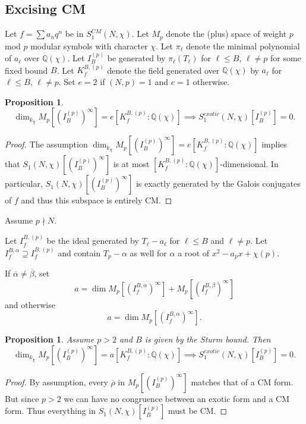 \documentclass[11pt]{amsart}
\theoremstyle{plain}
\newtheorem{prop}[thm]{Proposition}
\theoremstyle{definition}
\newcommand{\Q}{{\mathbb Q}}
\newcommand{\rhobar}{\overline{\rho}}
\renewcommand{\[}{\left[}
\renewcommand{\]}{\right]}
\begin{document}
\subsection{Excising CM}

Let $f=\sum a_n q^n$ be in $S_1^{CM}(N,\chi)$.  Let $M_p$ denote the (plus) space of weight $p$ mod $p$ modular symbols with character $\chi$.  Let $\pi_\ell$ denote the minimal polynomial of $a_\ell$ over $\Q(\chi)$.  Let $I^{(p)}_B$ be generated by $\pi_\ell(T_\ell)$ for $\ell \leq B$, $\ell \neq p$ for some fixed bound $B$.  Let $K_f^{B,(p)}$ denote the field generated over $\Q(\chi)$ by $a_\ell$ for $\ell \leq B$, $\ell \neq p$.  
Set $e=2$ if $(N,p)=1$ and $e=1$ otherwise.

\begin{prop}
$$\dim_{k_\chi} M_p[(I^{(p)}_B)^\infty] = e [K_f^{B,(p)}:\Q(\chi)] \implies
S_1^{exotic}(N,\chi)[I^{(p)}_B] = 0.
$$
\end{prop}

\begin{proof}
The assumption $\dim_{k_\chi} M_p[(I^{(p)}_B)^\infty] = e [K_f^{B,(p)}:\Q(\chi)]$ implies that $S_1(N,\chi)[(I^{(p)}_B)^\infty]$ is at most $[K_f^{B,(p)}:\Q(\chi)]$-dimensional.
In particular, $S_1(N,\chi)[(I^{(p)}_B)^\infty]$ is exactly generated by the Galois conjugates of $f$ and thus this subspace is entirely CM.
\end{proof}

Assume $p \nmid N$.

Let $I_f^{B,(p)}$ be the ideal generated by $T_\ell - a_\ell$ for $\ell \leq B$ and $\ell \neq p$.  Let $I_f^{B,\alpha} \supseteq I_f^{B,(p)}$ and contain $T_p - \alpha$ as well for $\alpha$ a root of $x^2 - a_px + \chi(p)$.

If $\overline{\alpha} \neq \overline{\beta}$, set
$$
a = \dim M_p[(I_f^{B,\alpha})^\infty] + M_p[(I_f^{B,\beta})^\infty]
$$
and otherwise
$$
a = \dim M_p[(I_f^{B,\alpha})^\infty].
$$

\begin{prop}
Assume $p > 2$ and $B$ is given by the Sturm bound.  Then
$$
\dim_{k_\chi} M_p[(I_B^{(p)})^\infty] = a [K_f^{B,(p)}:\Q(\chi)]
\implies
S_1^{exotic}(N,\chi)[I_B^{(p)}] = 0.
$$
\end{prop}

\begin{proof}
By assumption, every $\rhobar$ in $M_p[(I_B^{(p)})^\infty]$ matches that of a CM form.  But since $p>2$ we can have no congruence between an exotic form and a CM form.  Thus everything in $S_1(N,\chi)[I_B^{(p)}]$ must be CM.
\end{proof}
\end{document}
